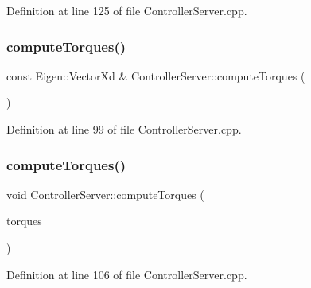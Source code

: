 Definition at line 125 of file Controller\+Server.\+cpp.

\hypertarget{classocra__recipes_1_1ControllerServer_a4b4c825748bc85f200f4b82cbffb8e0d}{}\label{classocra__recipes_1_1ControllerServer_a4b4c825748bc85f200f4b82cbffb8e0d} 
\subsubsection{\texorpdfstring{compute\+Torques()}{computeTorques()}\hspace{0.1cm}{\footnotesize\ttfamily [1/2]}}
{\footnotesize\ttfamily const Eigen\+::\+Vector\+Xd \& Controller\+Server\+::compute\+Torques (\begin{DoxyParamCaption}{ }\end{DoxyParamCaption})}



Definition at line 99 of file Controller\+Server.\+cpp.

\hypertarget{classocra__recipes_1_1ControllerServer_a925d4de1de73f0ac18e50f0f3c4cd0a4}{}\label{classocra__recipes_1_1ControllerServer_a925d4de1de73f0ac18e50f0f3c4cd0a4} 
\subsubsection{\texorpdfstring{compute\+Torques()}{computeTorques()}\hspace{0.1cm}{\footnotesize\ttfamily [2/2]}}
{\footnotesize\ttfamily void Controller\+Server\+::compute\+Torques (\begin{DoxyParamCaption}\item[{Eigen\+::\+Vector\+Xd \&}]{torques }\end{DoxyParamCaption})}



Definition at line 106 of file Controller\+Server.\+cpp.

\hypertarget{classocra__recipes_1_1ControllerServer_a40bc86b6d9a4140441320c88bfc77652}{}\label{classocra__recipes_1_1ControllerServer_a40bc86b6d9a4140441320c88bfc77652} 

